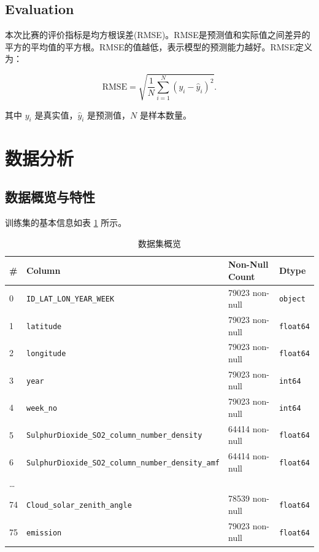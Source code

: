 \documentclass{ctexart}
\begin{document}
\begin{sloppypar}
\subsection{Evaluation}

本次比赛的评价指标是均方根误差(RMSE)。RMSE是预测值和实际值之间差异的平方的平均值的平方根。RMSE的值越低，表示模型的预测能力越好。RMSE定义为：

\[
    \text{RMSE}=\sqrt{\frac{1}{N}\sum\limits_{i=1}^{N}(y_i-\hat y_i)^2}.
\]

其中 $y_i$ 是真实值，$\hat y_i$ 是预测值，$N$ 是样本数量。

\section{数据分析}

\subsection{数据概览与特性}

训练集的基本信息如表 \ref{tab:0} 所示。

\begin{table}[h]
      \centering
      \caption{数据集概览\label{tab:0}}
      \begin{tabular}{llll}
            \hline
            \#       & Column                                                     & Non-Null Count & Dtype            \\ \hline
            0        & \texttt{ID\_LAT\_LON\_YEAR\_WEEK}                          & 79023 non-null & \texttt{object}  \\
            1        & \texttt{latitude}                                          & 79023 non-null & \texttt{float64} \\
            2        & \texttt{longitude}                                         & 79023 non-null & \texttt{float64} \\
            3        & \texttt{year}                                              & 79023 non-null & \texttt{int64}   \\
            4        & \texttt{week\_no}                                          & 79023 non-null & \texttt{int64}   \\
            5        & \texttt{SulphurDioxide\_SO2\_column\_number\_density}      & 64414 non-null & \texttt{float64} \\
            6        & \texttt{SulphurDioxide\_SO2\_column\_number\_density\_amf} & 64414 non-null & \texttt{float64} \\
            \ldots{} &                                                            &                &                  \\
            74       & \texttt{Cloud\_solar\_zenith\_angle}                       & 78539 non-null & \texttt{float64} \\
            75       & \texttt{emission}                                          & 79023 non-null & \texttt{float64} \\
            \hline
      \end{tabular}
\end{table}


\end{sloppypar}
\end{document}
